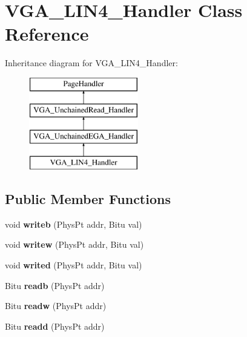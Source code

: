 \hypertarget{classVGA__LIN4__Handler}{\section{V\-G\-A\-\_\-\-L\-I\-N4\-\_\-\-Handler Class Reference}
\label{classVGA__LIN4__Handler}
}
Inheritance diagram for V\-G\-A\-\_\-\-L\-I\-N4\-\_\-\-Handler\-:\begin{figure}[H]
\begin{center}
\leavevmode
\includegraphics[height=4.000000cm]{classVGA__LIN4__Handler}
\end{center}
\end{figure}
\subsection*{Public Member Functions}
\begin{DoxyCompactItemize}
\item 
\hypertarget{classVGA__LIN4__Handler_a243672144b388a53aa3e1e84167b8009}{void {\bfseries writeb} (Phys\-Pt addr, Bitu val)}\label{classVGA__LIN4__Handler_a243672144b388a53aa3e1e84167b8009}

\item 
\hypertarget{classVGA__LIN4__Handler_a81695366cc25bbe55e283ae71102d968}{void {\bfseries writew} (Phys\-Pt addr, Bitu val)}\label{classVGA__LIN4__Handler_a81695366cc25bbe55e283ae71102d968}

\item 
\hypertarget{classVGA__LIN4__Handler_ac2939c08f431b03f8a849510aa402595}{void {\bfseries writed} (Phys\-Pt addr, Bitu val)}\label{classVGA__LIN4__Handler_ac2939c08f431b03f8a849510aa402595}

\item 
\hypertarget{classVGA__LIN4__Handler_a64b779e6f33cbef149d11dd8ab9122e3}{Bitu {\bfseries readb} (Phys\-Pt addr)}\label{classVGA__LIN4__Handler_a64b779e6f33cbef149d11dd8ab9122e3}

\item 
\hypertarget{classVGA__LIN4__Handler_a265798b87895d8fe13308c9ec4ad0c77}{Bitu {\bfseries readw} (Phys\-Pt addr)}\label{classVGA__LIN4__Handler_a265798b87895d8fe13308c9ec4ad0c77}

\item 
\hypertarget{classVGA__LIN4__Handler_a7c09a81a148e66af0e25bdbc7e0cab61}{Bitu {\bfseries readd} (Phys\-Pt addr)}\label{classVGA__LIN4__Handler_a7c09a81a148e66af0e25bdbc7e0cab61}

\end{DoxyCompactItemize}


